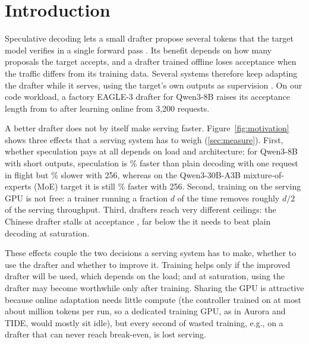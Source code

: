 \section{Introduction}\label{sec:intro}

Speculative decoding lets a small drafter propose several tokens that the target model verifies in a single forward pass \citep{leviathan2023fast,chen2023accelerating}. Its benefit depends on how many proposals the target accepts, and a drafter trained offline loses acceptance when the traffic differs from its training data. Several systems therefore keep adapting the drafter while it serves, using the target's own outputs as supervision \citep{liu2024osd,qian2026drafts,wang2026aurora,park2026tide}. On our code workload, a factory EAGLE-3 drafter for Qwen3-8B raises its acceptance length from  to  after learning online from 3{,}200 requests.

A better drafter does not by itself make serving faster. Figure~\ref{fig:motivation} shows three effects that a serving system has to weigh (\cref{sec:measure}). First, whether speculation pays at all depends on load and architecture: for Qwen3-8B with short outputs, speculation is \% faster than plain decoding with one request in flight but \% slower with 256, whereas on the Qwen3-30B-A3B mixture-of-experts (MoE) target it is still \% faster with 256. Second, training on the serving GPU is not free: a trainer running a fraction $d$ of the time removes roughly $d/2$ of the serving throughput. Third, drafters reach very different ceilings: the Chinese drafter stalls at acceptance , far below the  it needs to beat plain decoding at saturation.

These effects couple the two decisions a serving system has to make, whether to use the drafter and whether to improve it. Training helps only if the improved drafter will be used, which depends on the load; and at saturation, using the drafter may become worthwhile only after training. Sharing the GPU is attractive because online adaptation needs little compute (the controller trained on at most about  million tokens per run, so a dedicated training GPU, as in Aurora and TIDE, would mostly sit idle), but every second of wasted training, e.g., on a drafter that can never reach break-even, is lost serving.


